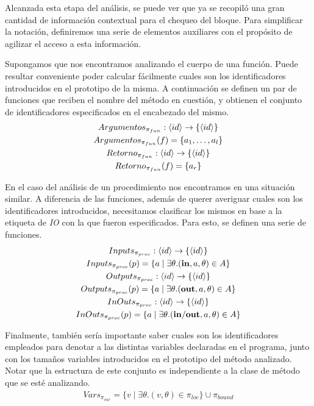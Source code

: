 \documentclass{article}
\begin{document}
Alcanzada esta etapa del análisis, se puede ver que ya se recopiló una gran cantidad de información contextual para el chequeo del bloque.
Para simplificar la notación, definiremos una serie de elementos auxiliares con el propósito de agilizar el acceso a esta información.

Supongamos que nos encontramos analizando el cuerpo de una función.
Puede resultar conveniente poder calcular fácilmente cuales son los identificadores introducidos en el prototipo de la misma.
A continuación se definen un par de funciones que reciben el nombre del método en cuestión, y obtienen el conjunto de identificadores especificados en el encabezado del mismo.
\begin{gather*}
Argumentos_{\pi_{fun}}: \langle id \rangle \rightarrow \{ \langle id \rangle \}
\\
Argumentos_{\pi_{fun}}(f) = \{ a_1, \ldots, a_l \}
\\
Retorno_{\pi_{fun}}: \langle id \rangle \rightarrow \{ \langle id \rangle \}
\\
Retorno_{\pi_{fun}}(f) = \{ a_r \}
\end{gather*}

En el caso del análisis de un procedimiento nos encontramos en una situación similar.
A diferencia de las funciones, además de querer averiguar cuales son los identificadores introducidos, necesitamos clasificar los mismos en base a la etiqueta de \textit{IO} con la que fueron especificados.
Para esto, se definen una serie de funciones.
\begin{gather*}
Inputs_{\pi_{proc}}: \langle id \rangle \rightarrow \{ \langle id \rangle \}
\\
Inputs_{\pi_{proc}}(p) = \{ a \mid \exists \theta. (\mathbf{in}, a, \theta) \in A \}
\\
Outputs_{\pi_{proc}}: \langle id \rangle \rightarrow \{ \langle id \rangle \}
\\
Outputs_{\pi_{proc}}(p) = \{ a \mid \exists \theta. (\mathbf{out}, a, \theta) \in A \}
\\
InOuts_{\pi_{proc}}: \langle id \rangle \rightarrow \{ \langle id \rangle \}
\\
InOuts_{\pi_{proc}}(p) = \{ a \mid \exists \theta. (\mathbf{in/out}, a, \theta) \in A \}
\end{gather*}

Finalmente, también sería importante saber cuales son los identificadores empleados para denotar a las distintas variables declaradas en el programa, junto con los tamaños variables introducidos en el prototipo del método analizado.
Notar que la estructura de este conjunto es independiente a la clase de método que se esté analizando.
\begin{gather*}
Vars_{\pi_{var}} = \{ v \mid \exists \theta. (v, \theta) \in \pi_{loc} \} \cup \pi_{bound}
\end{gather*}
\end{document}
